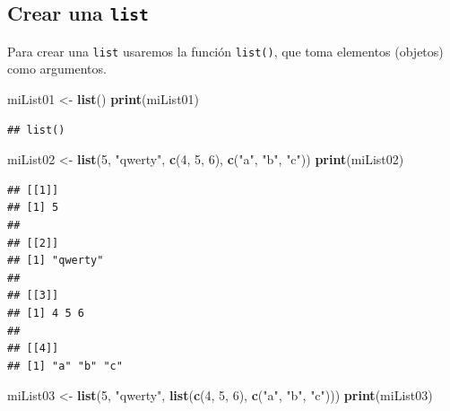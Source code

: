 \documentclass[
]{book}
\newenvironment{Shaded}{\begin{snugshade}}{\end{snugshade}}
\newcommand{\DecValTok}[1]{\textcolor[rgb]{0.00,0.00,0.81}{#1}}
\newcommand{\KeywordTok}[1]{\textcolor[rgb]{0.13,0.29,0.53}{\textbf{#1}}}
\newcommand{\NormalTok}[1]{#1}
\newcommand{\StringTok}[1]{\textcolor[rgb]{0.31,0.60,0.02}{#1}}
\begin{document}
\hypertarget{crear-una-list}{%
\subsection{\texorpdfstring{Crear una \texttt{list}}{Crear una list}}\label{crear-una-list}}

Para crear una \texttt{list} usaremos la función \texttt{list()}, que toma elementos (objetos) como argumentos.

\begin{Shaded}
\begin{Highlighting}[]
\NormalTok{miList01 <-}\StringTok{ }\KeywordTok{list}\NormalTok{()}
\KeywordTok{print}\NormalTok{(miList01)}
\end{Highlighting}
\end{Shaded}

\begin{verbatim}
## list()
\end{verbatim}

\begin{Shaded}
\begin{Highlighting}[]
\NormalTok{miList02 <-}\StringTok{ }\KeywordTok{list}\NormalTok{(}\DecValTok{5}\NormalTok{, }\StringTok{"qwerty"}\NormalTok{, }\KeywordTok{c}\NormalTok{(}\DecValTok{4}\NormalTok{, }\DecValTok{5}\NormalTok{, }\DecValTok{6}\NormalTok{), }\KeywordTok{c}\NormalTok{(}\StringTok{"a"}\NormalTok{, }\StringTok{"b"}\NormalTok{, }\StringTok{"c"}\NormalTok{))}
\KeywordTok{print}\NormalTok{(miList02)}
\end{Highlighting}
\end{Shaded}

\begin{verbatim}
## [[1]]
## [1] 5
## 
## [[2]]
## [1] "qwerty"
## 
## [[3]]
## [1] 4 5 6
## 
## [[4]]
## [1] "a" "b" "c"
\end{verbatim}

\begin{Shaded}
\begin{Highlighting}[]
\NormalTok{miList03 <-}\StringTok{ }\KeywordTok{list}\NormalTok{(}\DecValTok{5}\NormalTok{, }\StringTok{"qwerty"}\NormalTok{, }\KeywordTok{list}\NormalTok{(}\KeywordTok{c}\NormalTok{(}\DecValTok{4}\NormalTok{, }\DecValTok{5}\NormalTok{, }\DecValTok{6}\NormalTok{), }\KeywordTok{c}\NormalTok{(}\StringTok{"a"}\NormalTok{, }\StringTok{"b"}\NormalTok{, }\StringTok{"c"}\NormalTok{)))}
\KeywordTok{print}\NormalTok{(miList03)}
\end{Highlighting}
\end{Shaded}
\end{document}
